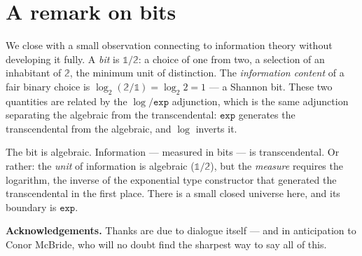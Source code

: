 \documentclass[11pt, a4paper]{article}
\theoremstyle{pearlstyle}
\newcommand{\bone}{\mathbb{1}}
\newcommand{\btwo}{\mathbb{2}}
\newcommand{\Exp}{\mathtt{exp}}
\begin{document}
\section{A remark on bits}

We close with a small observation connecting to information theory without
developing it fully. A \emph{bit} is $\bone/\btwo$: a choice of one from two,
a selection of an inhabitant of $\btwo$, the minimum unit of distinction. The
\emph{information content} of a fair binary choice is
$\log_2(\btwo/\bone) = \log_2 2 = 1$ --- a Shannon bit. These two quantities
are related by the $\log/\Exp$ adjunction, which is the same adjunction
separating the algebraic from the transcendental: $\Exp$ generates the
transcendental from the algebraic, and $\log$ inverts it.

The bit is algebraic. Information --- measured in bits --- is transcendental.
Or rather: the \emph{unit} of information is algebraic ($\bone/\btwo$), but the
\emph{measure} requires the logarithm, the inverse of the exponential type
constructor that generated the transcendental in the first place. There is a
small closed universe here, and its boundary is $\Exp$.

\bigskip
\noindent\textbf{Acknowledgements.} Thanks are due to dialogue itself --- and
in anticipation to Conor McBride, who will no doubt find the sharpest way to
say all of this.
\end{document}
